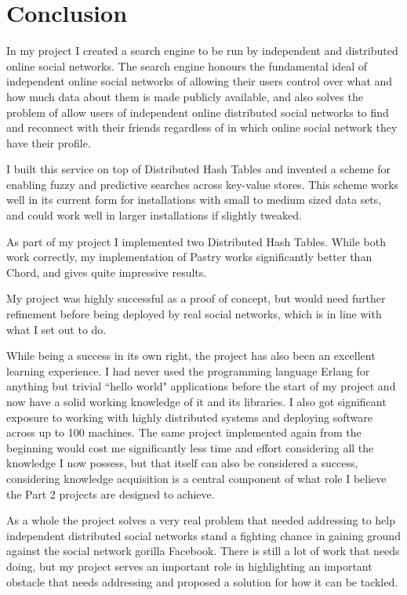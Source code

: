 

\section{Conclusion}
In my project I created a search engine to be run by independent and distributed online social networks. The search engine honours the fundamental ideal of independent online social networks of allowing their users control over what and how much data about them is made publicly available, and also solves the problem of allow users of independent online distributed social networks to find and reconnect with their friends regardless of in which online social network they have their profile.

I built this service on top of Distributed Hash Tables and invented a scheme for enabling fuzzy and predictive searches across key-value stores. This scheme works well in its current form for installations with small to medium sized data sets, and could work well in larger installations if slightly tweaked.

As part of my project I implemented two Distributed Hash Tables. While both work correctly, my implementation of Pastry works significantly better than Chord, and gives quite impressive results.

My project was highly successful as a proof of concept, but would need further refinement before being deployed by real social networks, which is in line with what I set out to do. 

\mbox{}

While being a success in its own right, the project has also been an excellent learning experience.
I had never used the programming language Erlang for anything but trivial ``hello world" applications before the start of my project and now have a solid working knowledge of it and its libraries. I also got significant exposure to working with highly distributed systems and deploying software across up to 100 machines.
The same project implemented again from the beginning would cost me significantly less time and effort considering all the knowledge I now possess, but that itself can also be considered a success, considering knowledge acquisition is a central component of what role I believe the Part 2 projects are designed to achieve.

\mbox{}

As a whole the project solves a very real problem that needed addressing to help independent distributed social networks stand a fighting chance in gaining ground against the social network gorilla Facebook. There is still a lot of work that needs doing, but my project serves an important role in highlighting an important obstacle that needs addressing and proposed a solution for how it can be tackled.
